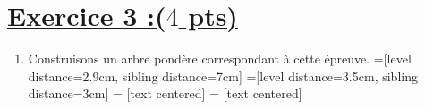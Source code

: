 \documentclass[12pt,a4paper]{article}
\begin{document}
\section*{\underline{Exercice 3 :($4$ pts)} }
\begin{enumerate}
    \item Construisons un arbre pondère correspondant à cette épreuve.
          =[level distance=2.9cm, sibling distance=7cm] %
          =[level distance=3.5cm, sibling distance=3cm] %
           = [text centered] %
           = [text centered] %

          \begin{tikzpicture}[grow=right, sloped] %


\end{tikzpicture}
\end{enumerate}
\end{document}
